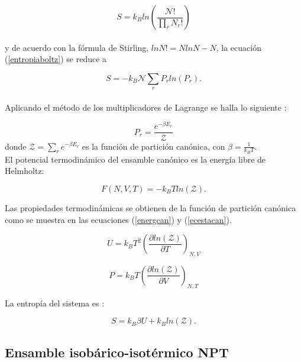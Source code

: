 \begin{equation}  \label{entropiaboltz}
    S = k_{B}ln\left(\frac{\mathcal{N}!}{\prod_r N_r!}\right)
\end{equation}\\

\noindent y de acuerdo con la fórmula de Stirling, $lnN!=NlnN-N$, la ecuación (\ref{entropiaboltz}) se reduce a

\begin{equation}  \label{entropiaboltzstirling}
    S = -k_{B}\mathcal{N}\sum_r P_rln(P_r).
\end{equation}\\

Aplicando el método de los multiplicadores de Lagrange se halla lo siguiente \cite{greiner1995}:

\begin{equation} \label{probcan}
    P_r = \frac{e^{-\beta E_r}}{\mathcal{Z}}
\end{equation}
\noindent donde $\mathcal{Z} = \sum_r e^{-\beta E_r}$ es la función de partición canónica, con $\beta=\frac{1}{k_{B}T}$.\\

El potencial termodinámico del ensamble canónico es la energía libre de Helmholtz:

\begin{equation} \label{potHelm}
    F(N,V,T)=-k_{B}Tln(\mathcal{Z}).
\end{equation}

Las propiedades termodinámicas se obtienen de la función de partición canónica como se muestra en las ecuaciones (\ref{energcan}) y (\ref{ecestacan}).

\begin{equation} \label{energcan}
    U=k_{B}T^2\left( \frac{\partial ln(\mathcal{Z})}{\partial T} \right)_{N,V}
\end{equation}  

\begin{equation} \label{ecestacan}
    P=k_{B}T\left( \frac{\partial ln(\mathcal{Z})}{\partial V} \right)_{N,T}
\end{equation}

La entropía del sistema es \cite{mandl1988statistical}:

\begin{equation} \label{entrnvt}
    S = k_{B}\beta U + k_{B}ln(\mathcal{Z}).
\end{equation}

\subsection{Ensamble isobárico-isotérmico NPT}

